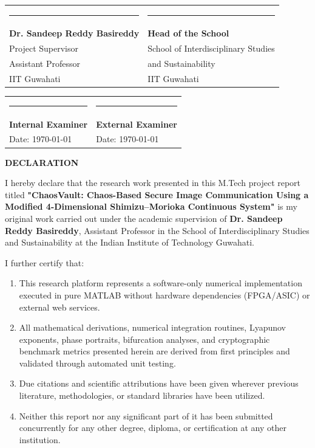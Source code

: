 \documentclass[12pt,a4paper,oneside]{report}
\begin{document}
\vspace{2.5cm}
\noindent\begin{tabular}{@{}p{7.2cm}p{7.2cm}@{}}
\rule{6.5cm}{0.4pt} & \rule{6.5cm}{0.4pt} \\
\textbf{Dr. Sandeep Reddy Basireddy} & \textbf{Head of the School} \\
Project Supervisor & School of Interdisciplinary Studies \\
Assistant Professor & and Sustainability \\
IIT Guwahati & IIT Guwahati
\end{tabular}

\vspace{2.0cm}
\noindent\begin{tabular}{@{}p{7.2cm}p{7.2cm}@{}}
\rule{6.5cm}{0.4pt} & \rule{6.5cm}{0.4pt} \\
\textbf{Internal Examiner} & \textbf{External Examiner} \\
Date: \today & Date: \today
\end{tabular}

\newpage
\thispagestyle{plain}
\begin{center}
    {\Large \bfseries DECLARATION} \par
\end{center}
\vspace{0.8cm}

\noindent I hereby declare that the research work presented in this M.Tech project report titled \textbf{"ChaosVault: Chaos-Based Secure Image Communication Using a Modified 4-Dimensional Shimizu--Morioka Continuous System"} is my original work carried out under the academic supervision of \textbf{Dr. Sandeep Reddy Basireddy}, Assistant Professor in the School of Interdisciplinary Studies and Sustainability at the Indian Institute of Technology Guwahati.

\vspace{0.4cm}
\noindent I further certify that:
\begin{enumerate}
    \item This research platform represents a software-only numerical implementation executed in pure MATLAB without hardware dependencies (FPGA/ASIC) or external web services.
    \item All mathematical derivations, numerical integration routines, Lyapunov exponents, phase portraits, bifurcation analyses, and cryptographic benchmark metrics presented herein are derived from first principles and validated through automated unit testing.
    \item Due citations and scientific attributions have been given wherever previous literature, methodologies, or standard libraries have been utilized.
    \item Neither this report nor any significant part of it has been submitted concurrently for any other degree, diploma, or certification at any other institution.
\end{enumerate}
\end{document}
